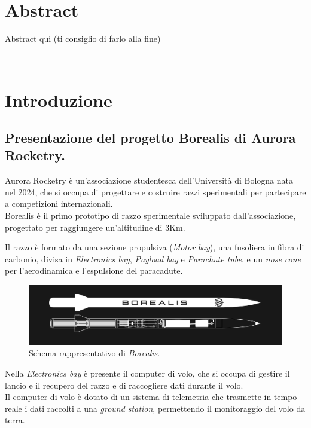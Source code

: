 \documentclass[12pt,a4paper,twoside]{book}
\begin{document}
\chapter*{Abstract}
Abstract qui (ti consiglio di farlo alla fine)

\topmargin=-1cm
\tableofcontents
\thispagestyle{empty}
\listoftables
\thispagestyle{empty}
\listoffigures
\thispagestyle{empty}
\newpage~\newpage


\setcounter{chapter}{0}
\raggedbottom
\chapter{Introduzione} \label{chap:intro}
\pagestyle{plain}
\setcounter{page}{1}

\section{Presentazione del progetto Borealis di Aurora Rocketry.}
Aurora Rocketry è un'associazione studentesca dell'Università di Bologna nata 
nel 2024, che si occupa di progettare e costruire razzi sperimentali per 
partecipare a competizioni internazionali. \\
Borealis è il primo prototipo di razzo sperimentale sviluppato 
dall'associazione, progettato per raggiungere un'altitudine di 3Km.

Il razzo è formato da una sezione propulsiva (\emph{Motor bay}), una fusoliera 
in fibra di carbonio, divisa in \emph{Electronics bay}, \emph{Payload bay} e 
\emph{Parachute tube}, e un \emph{nose cone} per l'aerodinamica 
e l'espulsione del paracadute. \\
\begin{figure}[H]
    \centering
    \includegraphics[width=\textwidth]{img/borealis-schema.png}
    \caption{Schema rappresentativo di \emph{Borealis}.}
    \label{fig:borealis-schema}
\end{figure}

Nella \emph{Electronics bay} è presente il computer di volo, che si occupa di 
gestire il lancio e il recupero del razzo e di raccogliere dati durante il volo. \\
Il computer di volo è dotato di un sistema di telemetria che trasmette in tempo 
reale i dati raccolti a una \emph{ground station}, permettendo il monitoraggio 
del volo da terra.
\end{document}
